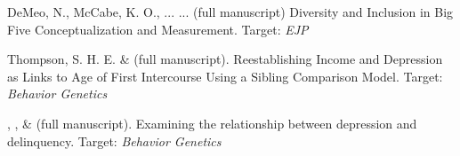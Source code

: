 \item DeMeo, N., McCabe, K. O., ... \meb ... (full manuscript) Diversity and Inclusion in Big Five Conceptualization and Measurement.  Target: \textit{EJP}

\item Thompson, S. H. E. \noteA \& \meb (full manuscript). Reestablishing Income and Depression as Links to Age of First Intercourse Using a Sibling Comparison Model. Target: \textit{Behavior Genetics}

\item \emsims, \jt, \& \meb (full manuscript). Examining the relationship between depression and delinquency. Target: \textit{Behavior Genetics}



%
%












